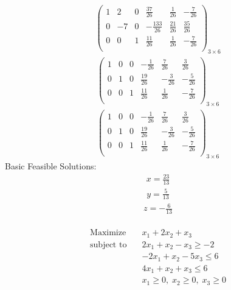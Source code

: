 \documentclass{article}
\begin{document}
\begin{align*}
\left(
\begin{array}{ccc|ccc}
1 & 2 & 0 & \frac{37}{26} & \frac{1}{26} & -\frac{7}{26}\\
0 & -7 & 0 & -\frac{133}{26} & \frac{21}{26} & \frac{35}{26}\\
0 & 0 & 1 & \frac{11}{26} & \frac{1}{26} & -\frac{7}{26}\\
\end{array}
\right)_{3\times 6}
\end{align*}
\begin{align*}
\left(
\begin{array}{ccc|ccc}
1 & 0 & 0 & -\frac{1}{26} & \frac{7}{26} & \frac{3}{26}\\
0 & 1 & 0 & \frac{19}{26} & -\frac{3}{26} & -\frac{5}{26}\\
0 & 0 & 1 & \frac{11}{26} & \frac{1}{26} & -\frac{7}{26}\\
\end{array}
\right)_{3\times 6}
\end{align*}
\begin{align*}
\left(
\begin{array}{ccc|ccc}
1 & 0 & 0 & -\frac{1}{26} & \frac{7}{26} & \frac{3}{26}\\
0 & 1 & 0 & \frac{19}{26} & -\frac{3}{26} & -\frac{5}{26}\\
0 & 0 & 1 & \frac{11}{26} & \frac{1}{26} & -\frac{7}{26}\\
\end{array}
\right)_{3\times 6}
\end{align*}
Basic Feasible Solutions:\\
\begin{align*}
x=\frac{23}{13}\end{align*}
  \begin{align*}
y=\frac{5}{13}\end{align*}
  \begin{align*}
z=-\frac{6}{13}\end{align*}
  \\
\begin{align*}
\text{Maximize} \quad & x_{1} + 2x_{2} + x_{3}\\
\text{subject to} \quad
& 2x_{1} + x_{2} - x_{3}\ge-2\\
& -2x_{1} + x_{2} - 5x_{3}\le6\\
& 4x_{1} + x_{2} + x_{3}\le6\\
& x_{1}\ge0,\; x_{2}\ge0,\; x_{3}\ge0\end{align*}
\end{document}
